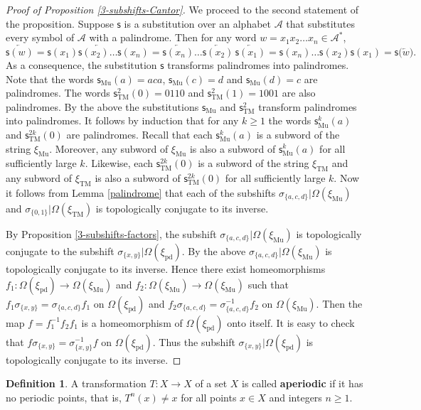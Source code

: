 \documentclass[12pt]{article}
\theoremstyle{definition}
\newtheorem{definition}[theorem]{Definition}
\def\cA{\mathcal{A}}
\def\si{\sigma}
\def\Om{\Omega}
\def\subst{\mathsf{s}}
\def\TM{\subst_{\mathrm{TM}}}
\def\sub{\subst_{\mathrm{Mu}}}
\def\xiTM{\xi_{\mathrm{TM}}}
\def\xipd{\xi_{\mathrm{pd}}}
\def\xiGE{\xi_{\mathrm{Mu}}}
\begin{document}
\begin{proof}[Proof of Proposition \ref{3-subshifts-Cantor}]
We proceed to the second statement of the proposition.  Suppose 
$\mathsf{s}$ is a substitution over an alphabet $\cA$ that substitutes 
every symbol of $\cA$ with a palindrome.  Then for any word $w=x_1x_2\ldots 
x_n\in\cA^*$,
\[
\overleftarrow{\mathsf{s}(w)}=
\overleftarrow{\mathsf{s}(x_1)\mathsf{s}(x_2)\ldots\mathsf{s}(x_n)}
=\overleftarrow{\mathsf{s}(x_n)}\ldots\overleftarrow{\mathsf{s}(x_2)}
\,\overleftarrow{\mathsf{s}(x_1)}= \mathsf{s}(x_n)\ldots\mathsf{s}(x_2) 
\mathsf{s}(x_1)=\mathsf{s}\bigl(\overleftarrow{w}\bigr).
\]
As a consequence, the substitution $\mathsf{s}$ transforms palindromes into 
palindromes.  Note that the words $\sub(a)=aca$, $\sub(c)=d$ and 
$\sub(d)=c$ are palindromes.  The words $\TM^2(0)=0110$ and $\TM^2(1)=1001$ 
are also palindromes.  By the above the substitutions $\sub$ and $\TM^2$ 
transform palindromes into palindromes.  It follows by induction that for 
any $k\ge1$ the words $\sub^k(a)$ and $\TM^{2k}(0)$ are palindromes.  
Recall that each $\sub^k(a)$ is a subword of the string $\xiGE$.  Moreover, 
any subword of $\xiGE$ is also a subword of $\sub^k(a)$ for all 
sufficiently large $k$.  Likewise, each $\TM^{2k}(0)$ is a subword of the 
string $\xiTM$ and any subword of $\xiTM$ is also a subword of 
$\TM^{2k}(0)$ for all sufficiently large $k$.  Now it follows from Lemma 
\ref{palindrome} that each of the subshifts $\si_{\{a,c,d\}}|\Om(\xiGE)$ 
and $\si_{\{0,1\}}|\Om(\xiTM)$ is topologically conjugate to its inverse.

By Proposition \ref{3-subshifts-factors}, the subshift 
$\si_{\{a,c,d\}}|\Om(\xiGE)$ is topologically conjugate to the subshift
$\si_{\{x,y\}}|\Om(\xipd)$.  By the above $\si_{\{a,c,d\}}|\Om(\xiGE)$ is 
topologically conjugate to its inverse.  Hence there exist homeomorphisms 
$f_1:\Om(\xipd)\to\Om(\xiGE)$ and $f_2:\Om(\xiGE)\to\Om(\xiGE)$ such that 
$f_1\si_{\{x,y\}}=\si_{\{a,c,d\}}f_1$ on $\Om(\xipd)$ and 
$f_2\si_{\{a,c,d\}}=\si_{\{a,c,d\}}^{-1}f_2$ on $\Om(\xiGE)$.  Then the map 
$f=f_1^{-1}f_2f_1$ is a homeomorphism of $\Om(\xipd)$ onto itself.  It is 
easy to check that $f\si_{\{x,y\}}=\si_{\{x,y\}}^{-1}f$ on $\Om(\xipd)$.  
Thus the subshift $\si_{\{x,y\}}|\Om(\xipd)$ is topologically conjugate to 
its inverse.
\end{proof}

\begin{definition}\label{def-aperiodic}
A transformation $T:X\to X$ of a set $X$ is called \textbf{aperiodic} if it 
has no periodic points, that is, $T^n(x)\ne x$ for all points $x\in X$ and 
integers $n\ge1$.
\end{definition}
\end{document}
